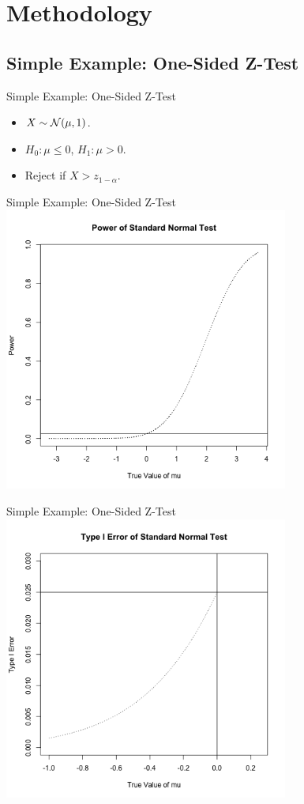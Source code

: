 \section{Methodology}
\frame{\tableofcontents[currentsection]}

\subsection{Simple Example: One-Sided Z-Test}

\begin{frame}{Simple Example: One-Sided Z-Test}
\begin{itemize}
    \item $X \sim \mathcal{N}(\mu, 1)$.
    \item $H_0: \mu \leq 0$, $H_1: \mu > 0$.
    \item Reject if $X > z_{1-\alpha}$.
\end{itemize}
\end{frame}

\begin{frame}{Simple Example: One-Sided Z-Test}
\centering
\includegraphics[width=0.7\textwidth]{figures/z-test-1.png}
\end{frame}

\begin{frame}{Simple Example: One-Sided Z-Test}
\centering
\includegraphics[width=0.7\textwidth]{figures/z-test-2.png}
\end{frame}

